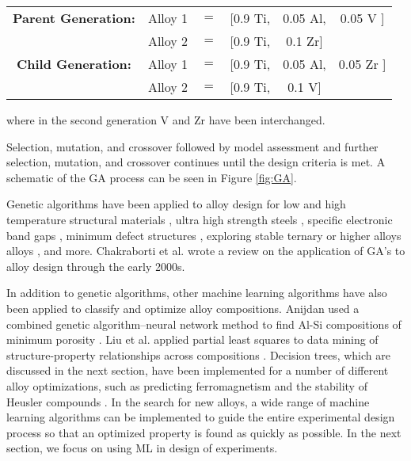 \begin{table}[h!]
\begin{center}
\begin{tabular}{c|ccccc}
	\textbf{Parent Generation:} & Alloy 1 & $=$ & [0.9 Ti, & 0.05 Al, & 0.05 {\color{red} V} ]  \\
						 & Alloy 2 & $=$ & [0.9 Ti, & 0.1 {\color{blue} Zr}] &              \\ \hline					 
	 \textbf{Child Generation:} & Alloy 1 & $=$ & [0.9 Ti, & 0.05 Al, & 0.05 {\color{blue} Zr} ]  \\
						& Alloy 2 & $=$ & [0.9 Ti, & 0.1 {\color{red} V}] &              \\ 
\end{tabular}
\end{center}
\end{table}
\noindent where in the second generation V and Zr have been interchanged.

Selection, mutation, and crossover followed by model assessment and further selection, mutation, and crossover continues until the design criteria is met. A schematic of the GA process can be seen in Figure \ref{fig:GA}. 

Genetic algorithms have been applied to alloy design for low and high temperature structural materials \cite{Ikeda1997, Kulkarni2004}, ultra high strength steels \cite{Xu2008}, specific electronic band gaps \cite{Dudiy2006}, minimum defect structures \cite{Anijdan2006}, exploring stable ternary or higher alloys alloys \cite{Hautier2010, Johannesson2002}, and more. Chakraborti et al. wrote a review on the application of GA's to alloy design through the early 2000s\cite{Chakraborti2004}.

In addition to genetic algorithms, other machine learning algorithms have also been applied to classify and optimize alloy compositions. Anijdan used a combined genetic algorithm--neural network method to find Al-Si compositions of minimum porosity \cite{Anijdan2006}. Liu et al. applied partial least squares to data mining of structure-property relationships across compositions \cite{Liu2006}. Decision trees, which are discussed in the next section, have been implemented for a number of different alloy optimizations, such as predicting ferromagnetism \cite{Landrum2003} and the stability of Heusler compounds \cite{Oliynyk2016}. In the search for new alloys, a wide range of machine learning algorithms can be implemented to guide the entire experimental design process so that an optimized property is found as quickly as possible. In the next section, we focus on using ML in design of experiments.
